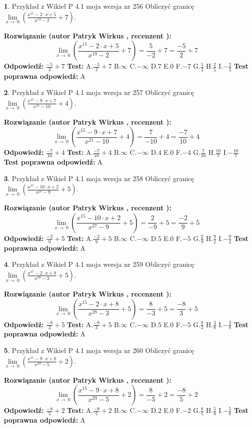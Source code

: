 \documentclass[12pt, a4paper]{article}
\theoremstyle{definition} %
\newtheorem{zad}{}
\newcommand{\zadStart}[1]{\begin{zad}#1\newline}
\newcommand{\zadStop}{\end{zad}}
\newcommand{\rozwStart}[2]{\noindent \textbf{Rozwiązanie (autor #1 , recenzent #2): }\newline}
\newcommand{\rozwStop}{\newline}
\newcommand{\odpStart}{\noindent \textbf{Odpowiedź:}\newline}
\newcommand{\odpStop}{\newline}
\newcommand{\testStart}{\noindent \textbf{Test:}\newline}
\newcommand{\testStop}{\newline}
\newcommand{\kluczStart}{\noindent \textbf{Test poprawna odpowiedź:}\newline}
\newcommand{\kluczStop}{\newline}
\begin{document}
\zadStart{Przykład z Wikieł P 4.1 moja wersja nr 256}
Obliczyć granicę $\lim\limits_{x\to\ 0}(\frac{x^{15}-2 \cdot x +5}{x^{19}-2}+7)$.
\zadStop
\rozwStart{Patryk Wirkus}{}
$$\lim\limits_{x\to\ 0}(\frac{x^{15}-2 \cdot x +5}{x^{19}-2}+7)=\frac{5}{-2}+7=\frac{-5}{2}+7$$
\rozwStop
\odpStart
$\frac{-5}{2}+7$
\odpStop
\testStart
A.$\frac{-5}{2}+7$
B.$\infty$
C.$-\infty$
D.$7$
E.$0$
F.$-7$
G.$\frac{5}{2}$
H.$\frac{2}{5}$
I.$-\frac{2}{5}$
\testStop
\kluczStart
A
\kluczStop



\zadStart{Przykład z Wikieł P 4.1 moja wersja nr 257}
Obliczyć granicę $\lim\limits_{x\to\ 0}(\frac{x^{15}-9 \cdot x +7}{x^{21}-10}+4)$.
\zadStop
\rozwStart{Patryk Wirkus}{}
$$\lim\limits_{x\to\ 0}(\frac{x^{15}-9 \cdot x +7}{x^{21}-10}+4)=\frac{7}{-10}+4=\frac{-7}{10}+4$$
\rozwStop
\odpStart
$\frac{-7}{10}+4$
\odpStop
\testStart
A.$\frac{-7}{10}+4$
B.$\infty$
C.$-\infty$
D.$4$
E.$0$
F.$-4$
G.$\frac{7}{10}$
H.$\frac{10}{7}$
I.$-\frac{10}{7}$
\testStop
\kluczStart
A
\kluczStop



\zadStart{Przykład z Wikieł P 4.1 moja wersja nr 258}
Obliczyć granicę $\lim\limits_{x\to\ 0}(\frac{x^{15}-10 \cdot x +2}{x^{27}-9}+5)$.
\zadStop
\rozwStart{Patryk Wirkus}{}
$$\lim\limits_{x\to\ 0}(\frac{x^{15}-10 \cdot x +2}{x^{27}-9}+5)=\frac{2}{-9}+5=\frac{-2}{9}+5$$
\rozwStop
\odpStart
$\frac{-2}{9}+5$
\odpStop
\testStart
A.$\frac{-2}{9}+5$
B.$\infty$
C.$-\infty$
D.$5$
E.$0$
F.$-5$
G.$\frac{2}{9}$
H.$\frac{9}{2}$
I.$-\frac{9}{2}$
\testStop
\kluczStart
A
\kluczStop



\zadStart{Przykład z Wikieł P 4.1 moja wersja nr 259}
Obliczyć granicę $\lim\limits_{x\to\ 0}(\frac{x^{15}-2 \cdot x +8}{x^{28}-3}+5)$.
\zadStop
\rozwStart{Patryk Wirkus}{}
$$\lim\limits_{x\to\ 0}(\frac{x^{15}-2 \cdot x +8}{x^{28}-3}+5)=\frac{8}{-3}+5=\frac{-8}{3}+5$$
\rozwStop
\odpStart
$\frac{-8}{3}+5$
\odpStop
\testStart
A.$\frac{-8}{3}+5$
B.$\infty$
C.$-\infty$
D.$5$
E.$0$
F.$-5$
G.$\frac{8}{3}$
H.$\frac{3}{8}$
I.$-\frac{3}{8}$
\testStop
\kluczStart
A
\kluczStop



\zadStart{Przykład z Wikieł P 4.1 moja wersja nr 260}
Obliczyć granicę $\lim\limits_{x\to\ 0}(\frac{x^{15}-9 \cdot x +8}{x^{29}-5}+2)$.
\zadStop
\rozwStart{Patryk Wirkus}{}
$$\lim\limits_{x\to\ 0}(\frac{x^{15}-9 \cdot x +8}{x^{29}-5}+2)=\frac{8}{-5}+2=\frac{-8}{5}+2$$
\rozwStop
\odpStart
$\frac{-8}{5}+2$
\odpStop
\testStart
A.$\frac{-8}{5}+2$
B.$\infty$
C.$-\infty$
D.$2$
E.$0$
F.$-2$
G.$\frac{8}{5}$
H.$\frac{5}{8}$
I.$-\frac{5}{8}$
\testStop
\kluczStart
A
\kluczStop
\end{document}
